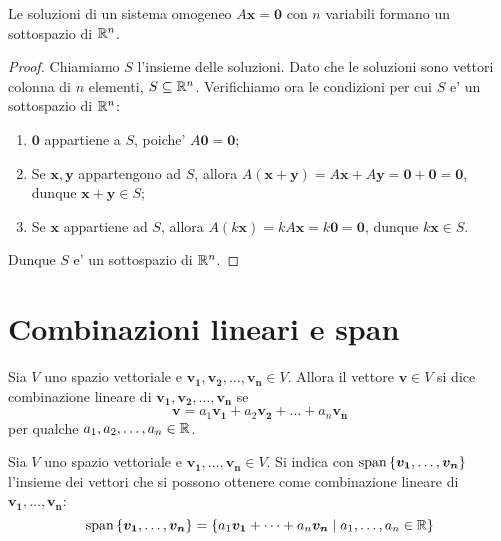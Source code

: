 \begin{proposition}
    Le soluzioni di un sistema omogeneo $A\bm{x} = \bm{0}$ con $n$ variabili formano un sottospazio di $\mathbb{R}^n$.
\end{proposition}
\begin{proof}
    Chiamiamo $S$ l'insieme delle soluzioni. Dato che le soluzioni sono vettori colonna di $n$ elementi, $S \subseteq \mathbb{R}^n$. Verifichiamo ora le condizioni per cui $S$ e' un sottospazio di $\mathbb{R}^n$:
    \begin{enumerate}
        \item $\bm{0}$ appartiene a $S$, poiche' $A\bm{0} = \bm{0}$;
        \item Se $\bm{x}, \bm{y}$ appartengono ad $S$, allora $A(\bm{x} + \bm{y}) = A\bm{x} + A\bm{y} = \bm{0} + \bm{0} = \bm{0}$, dunque $\bm{x} + \bm{y} \in S$;
        \item Se $\bm{x}$ appartiene ad $S$, allora $A(k\bm{x}) = kA\bm{x} = k\bm{0} = \bm{0}$, dunque $k\bm{x} \in S$.
    \end{enumerate}
    Dunque $S$ e' un sottospazio di $\mathbb{R}^n$.
\end{proof}

\section{Combinazioni lineari e span}
\begin{definition}
    Sia $V$ uno spazio vettoriale e $\bm{v_1}, \bm{v_2}, \dots, \bm{v_n} \in V$. Allora il vettore $\bm{v} \in V$ si dice combinazione lineare di $\bm{v_1}, \bm{v_2}, \dots, \bm{v_n}$ se 
    \begin{equation}
        \bm{v}= a_1\bm{v_1} + a_2\bm{v_2} + \dots + a_n\bm{v_n} 
    \end{equation}
    per qualche $a_1, a_2, \dots, a_n \in \mathbb{R}$.
\end{definition}

\begin{definition}
    Sia $V$ uno spazio vettoriale e $\bm{v_1}, \dots, \bm{v_n} \in V$. Si indica con $\operatorname{span}\left\{\bm{v_1}, \dots, \bm{v_n}\right\}$ l'insieme dei vettori che si possono ottenere come combinazione lineare di $\bm{v_1}, \dots, \bm{v_n}$:
    \begin{equation}
        \operatorname{span}\left\{\bm{v_1}, \dots, \bm{v_n}\right\} = \left\{a_1\bm{v_1} + \dots + a_n\bm{v_n} \mid a_1, \dots, a_n \in \mathbb{R}\right\}
    \end{equation}
\end{definition}

